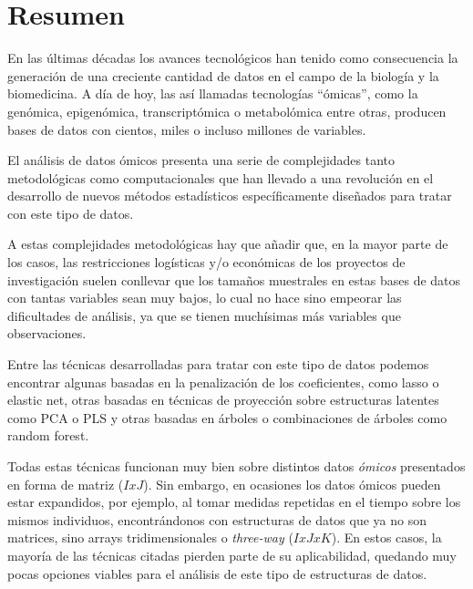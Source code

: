 
\chapter*{Resumen}


En las últimas décadas los avances tecnológicos han tenido como consecuencia la generación de una creciente cantidad de datos en el campo de la biología y la biomedicina. A día de hoy, las así llamadas tecnologías “ómicas”, como la genómica, epigenómica, transcriptómica o metabolómica entre otras, producen bases de datos con cientos, miles o incluso millones de variables. 

El análisis de datos ómicos presenta una serie de complejidades tanto metodológicas como computacionales que han llevado a una revolución en el desarrollo de nuevos métodos estadísticos específicamente diseñados para tratar con este tipo de datos. 

A estas complejidades metodológicas hay que añadir que, en la mayor parte de los casos, las restricciones logísticas y/o económicas de los proyectos de investigación suelen conllevar que los tamaños muestrales en estas bases de datos con tantas variables sean muy bajos, lo cual no hace sino empeorar las dificultades de análisis, ya que se tienen muchísimas más variables que observaciones.

Entre las técnicas desarrolladas para tratar con este tipo de datos podemos encontrar algunas basadas en la penalización de los coeficientes, como lasso o elastic net, otras basadas en técnicas de proyección sobre estructuras latentes como PCA o PLS y otras basadas en árboles o combinaciones de árboles como random forest.

Todas estas técnicas funcionan muy bien sobre distintos datos \textit{ómicos} presentados en forma de matriz ($IxJ$). Sin embargo, en ocasiones los datos ómicos pueden estar expandidos, por ejemplo, al tomar medidas repetidas en el tiempo sobre los mismos individuos, encontrándonos con estructuras de datos que ya no son matrices, sino arrays tridimensionales o \textit{three-way} ($IxJxK$). En estos casos, la mayoría de las técnicas citadas pierden parte de su aplicabilidad, quedando muy pocas opciones viables para el análisis de este tipo de estructuras de datos.

